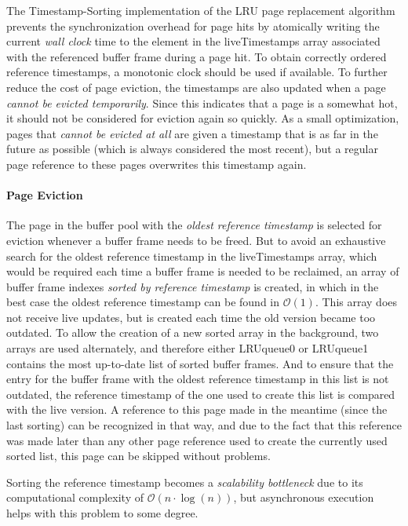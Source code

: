     The Timestamp-Sorting implementation of the LRU page replacement algorithm prevents the synchronization overhead for page hits by atomically writing the current \emph{wall clock} time to the element in the liveTimestamps array associated with the referenced buffer frame during a page hit. To obtain correctly ordered reference timestamps, a monotonic clock should be used if available. To further reduce the cost of page eviction, the timestamps are also updated when a page \emph{cannot be evicted temporarily}. Since this indicates that a page is a somewhat hot, it should not be considered for eviction again so quickly. As a small optimization, pages that \emph{cannot be evicted at all} are given a timestamp that is as far in the future as possible (which is always considered the most recent), but a regular page reference to these pages overwrites this timestamp again.

\paragraph{Page Eviction}

    The page in the buffer pool with the \emph{oldest reference timestamp} is selected for eviction whenever a buffer frame needs to be freed. But to avoid an exhaustive search for the oldest reference timestamp in the liveTimestamps array, which would be required each time a buffer frame is needed to be reclaimed, an array of buffer frame indexes \emph{sorted by reference timestamp} is created, in which in the best case the oldest reference timestamp can be found in $\mathcal{O}\left(1\right)$. This array does not receive live updates, but is created each time the old version became too outdated. To allow the creation of a new sorted array in the background, two arrays are used alternately, and therefore either LRUqueue0 or LRUqueue1 contains the most up-to-date list of sorted buffer frames. And to ensure that the entry for the buffer frame with the oldest reference timestamp in this list is not outdated, the reference timestamp of the one used to create this list is compared with the live version. A reference to this page made in the meantime (since the last sorting) can be recognized in that way, and due to the fact that this reference was made later than any other page reference used to create the currently used sorted list, this page can be skipped without problems.

    Sorting the reference timestamp becomes a \emph{scalability bottleneck} due to its computational complexity of $\mathcal{O}\left(n \cdot \log\left(n\right)\right)$, but asynchronous execution helps with this problem to some degree.

